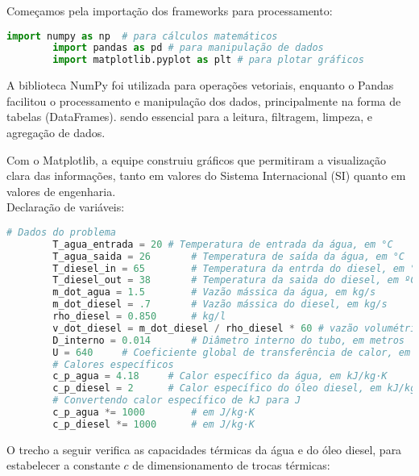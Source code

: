 Começamos pela importação dos frameworks para processamento:

\begin{center}
	\begin{lstlisting}[language=Python]
		import numpy as np  # para cálculos matemáticos
		import pandas as pd # para manipulação de dados
		import matplotlib.pyplot as plt # para plotar gráficos
\end{lstlisting}

\end{center}

A biblioteca NumPy foi utilizada para operações vetoriais, enquanto o Pandas facilitou o processamento e manipulação dos dados, principalmente na forma de tabelas (DataFrames). sendo essencial para a leitura, filtragem, limpeza, e agregação de dados. \cite{g_2008_manipulating, harris_2020_array}

Com o Matplotlib, a equipe construiu gráficos que permitiram a visualização clara das informações, tanto em valores do Sistema Internacional (SI) quanto em valores de engenharia.  \cite{hunter_2007_matplotlib}\\

Declaração de variáveis:
\begin{center}
	\begin{lstlisting}[language=python]
		# Dados do problema
		T_agua_entrada = 20 # Temperatura de entrada da água, em °C
		T_agua_saida = 26		# Temperatura de saída da água, em °C
		T_diesel_in = 65		# Temperatura da entrda do diesel, em °C
		T_diesel_out = 38		# Temperatura da saida do diesel, em ºC
		m_dot_agua = 1.5		# Vazão mássica da água, em kg/s
		m_dot_diesel = .7		# Vazão mássica do diesel, em kg/s
		rho_diesel = 0.850		# kg/l
		v_dot_diesel = m_dot_diesel / rho_diesel * 60 # vazão volumétrica do disel
		D_interno = 0.014		# Diâmetro interno do tubo, em metros
		U = 640		# Coeficiente global de transferência de calor, em W/m²·K
		# Calores específicos
		c_p_agua = 4.18		# Calor específico da água, em kJ/kg·K
		c_p_diesel = 2		# Calor específico do óleo diesel, em kJ/kg·K
		# Convertendo calor específico de kJ para J
		c_p_agua *= 1000		# em J/kg·K
		c_p_diesel *= 1000		# em J/kg·K
	\end{lstlisting}
\end{center}

O trecho a seguir verifica as capacidades térmicas da água e do óleo diesel, para estabelecer a constante \(c\) de dimensionamento de trocas térmicas:

